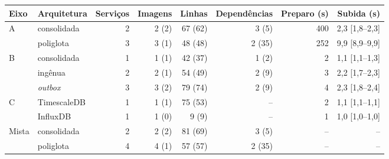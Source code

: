 \begin{tabular}{llrrrrrr}
\hline
Eixo & Arquitetura & Serviços & Imagens & Linhas & Dependências & Preparo (s) & Subida (s) \\
\hline
A & consolidada & 2 & 2 (2) & 67 (62) & 3 (5) & 400 & 2,3 [1,8--2,3] \\
 & poliglota & 3 & 3 (1) & 48 (48) & 2 (35) & 252 & 9,9 [8,9--9,9] \\
\hline
B & consolidada & 1 & 1 (1) & 42 (37) & 1 (2) & 2 & 1,1 [1,1--1,3] \\
 & ingênua & 2 & 2 (1) & 54 (49) & 2 (9) & 3 & 2,2 [1,7--2,3] \\
 & \emph{outbox} & 3 & 3 (2) & 79 (74) & 2 (9) & 4 & 2,3 [1,8--2,4] \\
\hline
C & TimescaleDB & 1 & 1 (1) & 75 (53) & -- & 2 & 1,1 [1,1--1,1] \\
 & InfluxDB & 1 & 1 (0) & 9 (9) & -- & 1 & 1,0 [1,0--1,0] \\
\hline
Mista & consolidada & 2 & 2 (2) & 81 (69) & 3 (5) & -- & -- \\
 & poliglota & 4 & 4 (1) & 57 (57) & 2 (35) & -- & -- \\
\hline
\end{tabular}
